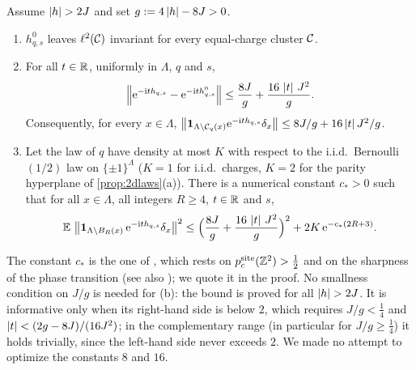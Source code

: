 \begin{proposition}\label{prop:cluster}
Assume $\abs h>2J$ and set $g:=4\left|h\right|-8J>0$.
\begin{enumerate}[label=(\alph*)]
\item $h^0_{q,s}$ leaves $\ell^2(\mathcal{C})$ invariant for every equal-charge cluster $\mathcal{C}$.
\item For all $t\in\mathbb{R}$, uniformly in $\Lambda$, $q$ and $s$,
\begin{equation}\label{eq:clusterbound}
  \left\|\mathrm{e}^{-\mathrm{i} th_{q,s}}-\mathrm{e}^{-\mathrm{i} th^0_{q,s}}\right\|\le\frac{8J}{g}+\frac{16\,\left|t\right|\,J^2}{g} .
\end{equation}
Consequently, for every $x\in\Lambda$, $\left\|\mathbf{1}_{\Lambda\setminus\mathcal{C}_q(x)}\mathrm{e}^{-\mathrm{i} th_{q,s}}\delta_x\right\|\le8J/g+16\left|t\right|J^2/g$.
\item Let the law of $q$ have density at most $K$ with respect to the i.i.d.\ Bernoulli$(1/2)$ law on
$\{\pm1\}^\Lambda$ ($K=1$ for i.i.d.\ charges, $K=2$ for the parity hyperplane of \cref{prop:2dlaws}(a)).
There is a numerical constant $c_*>0$ such that for all $x\in\Lambda$, all integers $R\ge4$, $t\in\mathbb{R}$ and $s$,
\begin{equation}\label{eq:clusterprob}
  \mathbb{E}\,\left\|\mathbf{1}_{\Lambda\setminus B_R(x)}\,\mathrm{e}^{-\mathrm{i} th_{q,s}}\delta_x\right\|^2
  \le\Bigl(\frac{8J}{g}+\frac{16\,\left|t\right|\,J^2}{g}\Bigr)^2+2K\,\mathrm{e}^{-c_*(2R+3)} .
\end{equation}
\end{enumerate}
\end{proposition}

The constant $c_*$ is the one of \cite[Prop.~2.2]{LiL2022}, which rests on $p_c^{\rm site}(\mathbb{Z}^2)>\frac12$
\cite{GrimmettStacey1998} and on the sharpness of the phase transition \cite[Thm.~7.3]{AizenmanBarsky1987} (see
also \cite{Menshikov1986}); we quote it in the proof.  No smallness condition on $J/g$ is needed for (b): the bound is proved for all
$\abs h>2J$.  It is informative only when its right-hand side is below $2$, which requires $J/g<\frac14$ and
$\left|t\right|<(2g-8J)/(16J^2)$; in the complementary range (in particular for $J/g\ge\frac14$) it holds trivially,
since the left-hand side never exceeds $2$.  We made no attempt to optimize the constants $8$ and $16$.

